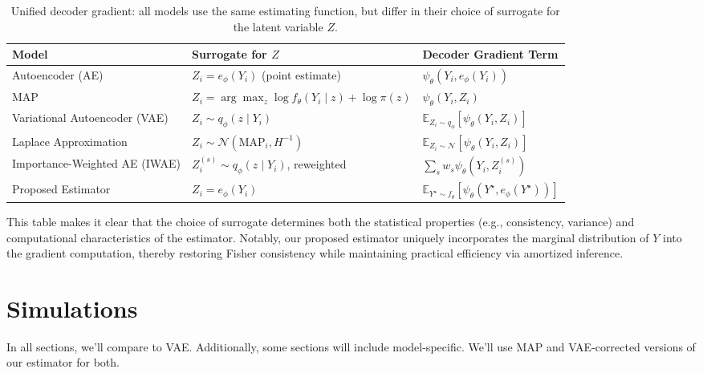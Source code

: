 \documentclass[twoside,11pt]{article}
\begin{document}
\begin{table}[h]
\centering
\caption{Unified decoder gradient: all models use the same estimating function, but differ in their choice of surrogate for the latent variable \( Z \).}
\label{tab:surrogates}
\begin{tabular}{lll}
\toprule
\textbf{Model} & \textbf{Surrogate for \( Z \)} & \textbf{Decoder Gradient Term} \\
\midrule
Autoencoder (AE) & \( Z_i = e_\phi(Y_i) \) (point estimate) & 
\(
\psi_\theta(Y_i, e_\phi(Y_i))
\) \\

MAP & \( Z_i = \arg\max_z \log f_\theta(Y_i \mid z) + \log \pi(z) \) & 
\(
\psi_\theta(Y_i, Z_i)
\) \\

Variational Autoencoder (VAE) & \( Z_i \sim q_\phi(z \mid Y_i) \) & 
\(
\mathbb{E}_{Z_i \sim q_\phi}[\psi_\theta(Y_i, Z_i)]
\) \\

Laplace Approximation & \( Z_i \sim \mathcal{N}(\text{MAP}_i, H^{-1}) \) & 
\(
\mathbb{E}_{Z_i \sim \mathcal{N}}[\psi_\theta(Y_i, Z_i)]
\) \\

Importance-Weighted AE (IWAE) & \( Z_i^{(s)} \sim q_\phi(z \mid Y_i) \), reweighted & 
\(
\sum_s w_s \psi_\theta(Y_i, Z_i^{(s)})
\) \\

Proposed Estimator & \( Z_i = e_\phi(Y_i) \) & 
\(
\mathbb{E}_{Y^\star \sim f_\theta}[\psi_\theta(Y^\star, e_\phi(Y^\star))]
\) \\
\bottomrule
\end{tabular}
\end{table}

This table makes it clear that the choice of surrogate determines both the statistical properties (e.g., consistency, variance) and computational characteristics of the estimator. Notably, our proposed estimator uniquely incorporates the marginal distribution of \( Y \) into the gradient computation, thereby restoring Fisher consistency while maintaining practical efficiency via amortized inference.

\section{Simulations}
In all sections, we'll compare to VAE. Additionally, some sections will include model-specific. We'll use MAP and VAE-corrected versions of our estimator for both.
\end{document}
